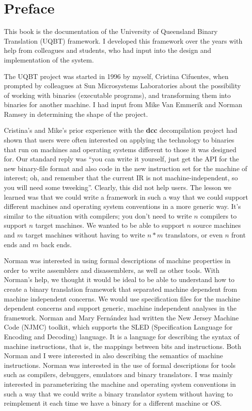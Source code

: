 
\chapter*{Preface}

This book is the documentation of the University of Queensland 
Binary Translation (UQBT) framework. I  developed this framework over
the years with help from colleagues and students, who had input into 
the design and implementation of the system.

The UQBT project was started in 1996 by myself, Cristina Cifuentes, 
when prompted by colleagues at Sun Microsystems Laboratories 
about the possibility of working with binaries (executable programs), 
and transforming them into binaries for another machine.   
I had input from Mike Van Emmerik and Norman Ramsey in determining 
the shape of the project. 

Cristina's and Mike's prior experience with the {\bf dcc} decompilation 
project had shown that users were often interested on applying
the technology to binaries that run on machines and 
operating systems different to those it was designed for.
Our standard reply was ``you can write it yourself, 
just get the API for the new binary-file format and also code in the 
new instruction set for the machine of interest; oh, and remember that
the current IR is not machine-independent, so you will need some 
tweeking''.  Clearly, this did not help users.  The lesson we learned 
was that we could write a framework in such a way that we could 
support different machines and operating system conventions in a 
more generic way.
It's similar to the situation with compilers; you don't need to write $n$
compilers to support $n$ target machines. We wanted to be able to support
$n$ source machines and $m$ target machines without having to write
$n*m$ translators, or even $n$ front ends and $m$ back ends.

Norman was interested in using formal descriptions of machine properties
in order to write assemblers and disassemblers, as well as other tools. 
With Norman's help, we thought it would be ideal to be able to understand 
how to create a binary translation framework that separated machine 
dependent from machine independent concerns. We would use specification
files for the 
machine dependent concerns and support generic, machine independent 
analyses in the framework.  Norman and Mary Fern\'{a}ndez had written 
the New Jersey Machine Code (NJMC) toolkit, which supports the 
SLED (Specification Language for Encoding and Decoding) language. 
It is a language for describing the syntax of machine instructions, that is, 
the mappings between bits and instructions.  Both Norman and 
I were interested in also describing the semantics of machine instructions. 
Norman was interested in the use of formal descriptions for tools 
such as compilers, debuggers, emulators and binary translators.  
I was mainly interested in parameterizing the machine and operating 
system conventions in such a way that we could write a binary translator 
system without having to reimplement it each time we have a binary 
for a different machine or OS. 

